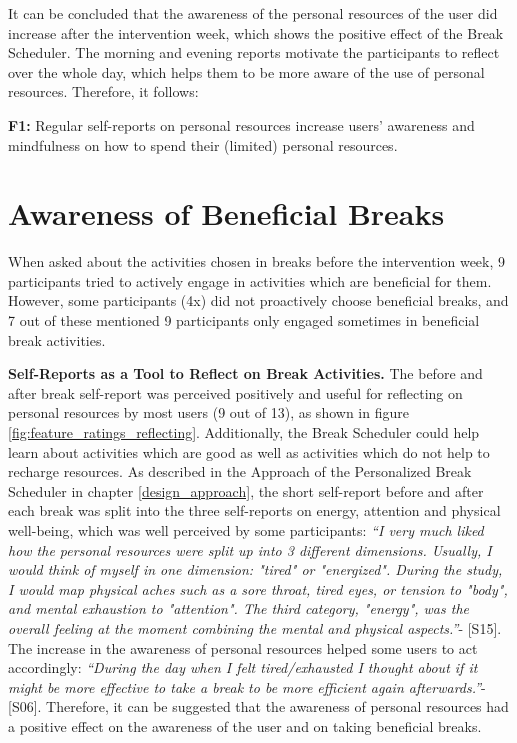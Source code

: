 \documentclass{hasel_thesis}
\begin{document}
It can be concluded that the awareness of the personal resources of the user did increase after the intervention week, which shows the positive effect of the Break Scheduler. The morning and evening reports motivate the participants to reflect over the whole day, which helps them to be more aware of the use of personal resources. Therefore, it follows:

\begin{tcolorbox}[colback=white!5!white,colframe=black!75!black]
  \textbf{F1:} Regular self-reports on personal resources increase users' awareness and mindfulness on how to spend their (limited) personal resources.
\end{tcolorbox}


\section{Awareness of Beneficial Breaks} \label{beneficial_breaks}

When asked about the activities chosen in breaks before the intervention week, 9 participants tried to actively engage in activities which are beneficial for them. However, some participants (4x) did not proactively choose beneficial breaks, and 7 out of these mentioned 9 participants only engaged sometimes in beneficial break activities.

\textbf{Self-Reports as a Tool to Reflect on Break Activities.}
The before and after break self-report was perceived positively and useful for reflecting on personal resources by most users (9 out of 13), as shown in figure \ref{fig:feature_ratings_reflecting}. Additionally, the Break Scheduler could help learn about activities which are good as well as activities which do not help to recharge resources. As described in the Approach of the Personalized Break Scheduler in chapter \ref{design_approach}, the short self-report before and after each break was split into the three self-reports on energy, attention and physical well-being, which was well perceived by some participants: \textit{“I very much liked how the personal resources were split up into 3 different dimensions. Usually, I would think of myself in one dimension: "tired" or "energized". During the study, I would map physical aches such as a sore throat, tired eyes, or tension to "body", and mental exhaustion to "attention". The third category, "energy", was the overall feeling at the moment combining the mental and physical aspects.”}- [S15]. The increase in the awareness of personal resources helped some users to act accordingly: \textit{“During the day when I felt tired/exhausted I thought about if it might be more effective to take a break to be more efficient again afterwards.”}-[S06]. Therefore, it can be suggested that the awareness of personal resources had a positive effect on the awareness of the user and on taking beneficial breaks.
\end{document}
